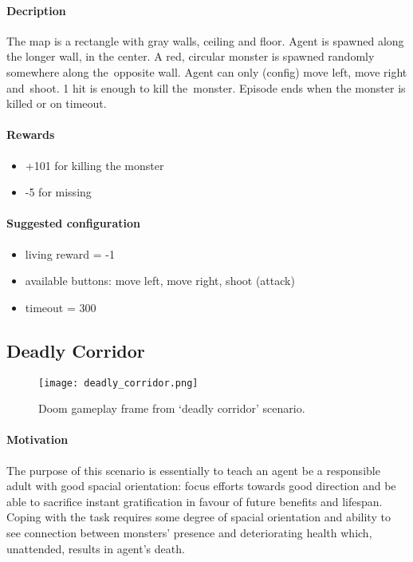 		\paragraph{Decription}
			The map is a rectangle with gray walls, ceiling and floor. Agent is spawned along the longer wall, in the center. A red, circular monster is spawned randomly somewhere along the~opposite wall. Agent can only (config) move left, move right and~shoot. 1 hit is enough to kill the~monster. Episode ends when the monster is killed or on timeout.
		
		\paragraph{Rewards}
			\begin{itemize}
				\item +101 for killing the monster
				\item -5 for missing
			\end{itemize}
		
		\paragraph{Suggested configuration}
			\begin{itemize}
				\item living reward = -1
				\item available buttons: move left, move right, shoot (attack)
				\item timeout = 300
			\end{itemize}
	\newpage

	\subsection{Deadly Corridor}
		\begin{figure}
			\centering
			\texttt{[image: deadly\_corridor.png]}
			\caption{Doom gameplay frame from `deadly corridor' scenario.}\label{fig:deadly_corridor}
		\end{figure}

		\paragraph{Motivation} 
			The purpose of this scenario is essentially to teach an agent be a responsible adult with good spacial orientation: focus efforts towards good direction and be able to sacrifice instant gratification in favour of future benefits and lifespan. Coping with the task requires some degree of spacial orientation and ability to see connection between monsters' presence and deteriorating health which, unattended, results in agent's death.

